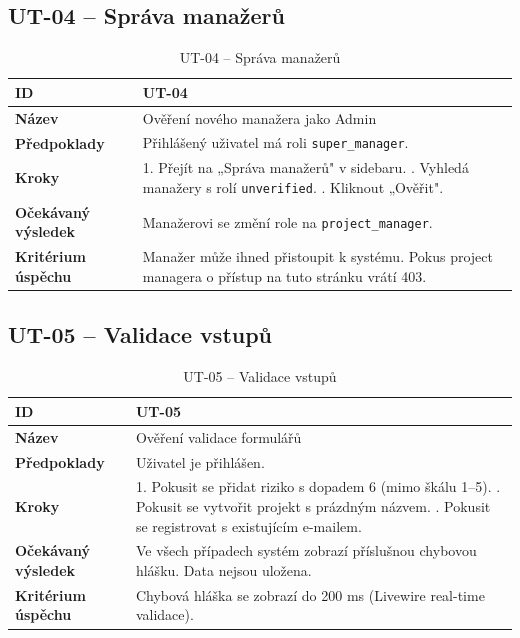 \documentclass{mpr}
\begin{document}
\subsection{UT-04 – Správa manažerů}

\begin{table}[H]
    \centering
    \begin{tabularx}{\textwidth}{|l|X|}
        \hline
        \textbf{ID}                 & UT-04 \\
        \hline
        \textbf{Název}              & Ověření nového manažera jako Admin \\
        \hline
        \textbf{Předpoklady}        & Přihlášený uživatel má roli \texttt{super\_manager}. \\
        \hline
        \textbf{Kroky}              & 1. Přejít na „Správa manažerů" v sidebaru. \newline
                                      2. Vyhledá manažery s rolí \texttt{unverified}. \newline
                                      3. Kliknout „Ověřit". \\
        \hline
        \textbf{Očekávaný výsledek} & Manažerovi se změní role na \texttt{project\_manager}. \\
        \hline
        \textbf{Kritérium úspěchu}  & Manažer může ihned přistoupit k systému. Pokus project managera o přístup na tuto stránku vrátí 403. \\
        \hline
    \end{tabularx}
    \caption{UT-04 – Správa manažerů}
\end{table}

\subsection{UT-05 – Validace vstupů}

\begin{table}[H]
    \centering
    \begin{tabularx}{\textwidth}{|l|X|}
        \hline
        \textbf{ID}                 & UT-05 \\
        \hline
        \textbf{Název}              & Ověření validace formulářů \\
        \hline
        \textbf{Předpoklady}        & Uživatel je přihlášen. \\
        \hline
        \textbf{Kroky}              & 1. Pokusit se přidat riziko s dopadem 6 (mimo škálu 1–5). \newline
                                      2. Pokusit se vytvořit projekt s prázdným názvem. \newline
                                      3. Pokusit se registrovat s existujícím e-mailem. \\
        \hline
        \textbf{Očekávaný výsledek} & Ve všech případech systém zobrazí příslušnou chybovou hlášku. Data nejsou uložena. \\
        \hline
        \textbf{Kritérium úspěchu}  & Chybová hláška se zobrazí do 200 ms (Livewire real-time validace). \\
        \hline
    \end{tabularx}
    \caption{UT-05 – Validace vstupů}
\end{table}
\end{document}
